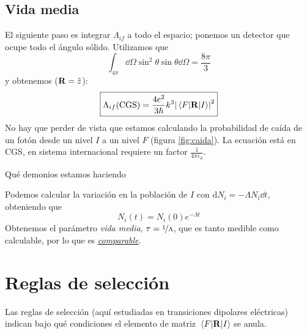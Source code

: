 \subsection{Vida media}
El siguiente paso es integrar $\Lambda_{if}$ a todo el espacio;
ponemos un detector que ocupe todo el ángulo sólido. Utilizamos que
\begin{equation}
  \int_{4\pi} \dd{\Omega} \sin^2\theta \sin \theta \dd{\Omega} = \frac{8\pi}{3}
\end{equation}
y obtenemos ($\bm{\mathrm{R}}=\hat{z}$):
\begin{equation}
  \boxed{
  \Lambda_{if} (\text{CGS}) = \frac{4e^2}{3 \hbar} k^3 \abs{\mel{F}{\bm{\mathrm{R}}}{I}}^2
  }
\end{equation}
No hay que perder de vista que estamos calculando la probabilidad de
caída de un fotón desde un nivel $I$ a un nivel $F$ (figura
\ref{fig:caida}). La ecuación está en CGS, en sistema internacional
requiere un factor $\frac{1}{4\pi \varepsilon_0}$.
\begin{marginfigure}
  \caption{Qué demonios estamos haciendo}
  \label{fig:caida}
\end{marginfigure}
Podemos calcular la variación en la población de $I$ con $\text{d}N_i
= -\Lambda N_i \dd{t}$, obteniendo que
\begin{equation}
  N_i(t) = N_i(0) e^{-\Lambda t}
\end{equation}
Obtenemos el parámetro \emph{vida media},
$\tau=\nicefrac{1}{\Lambda}$, que es tanto medible como calculable,
por lo que es \underline{\emph{comparable}}.

\section{Reglas de selección}
Las reglas de selección (aquí estudiadas en transiciones dipolares eléctricas)
indican bajo qué condiciones el elemento de matriz
$\mel{F}{\bm{\mathrm{R}}}{I}$ se anula. 

